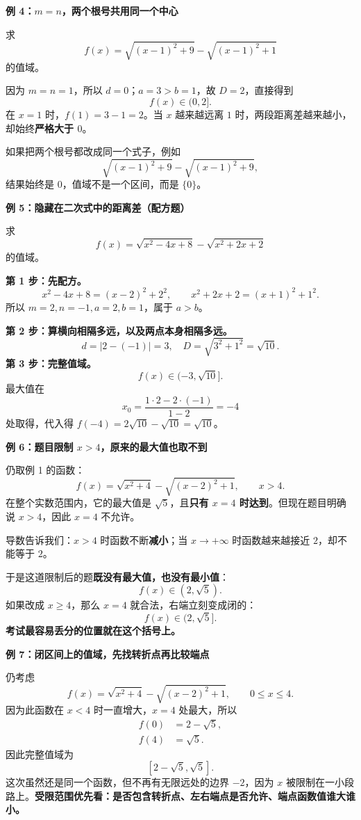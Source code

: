 \clearpage
\begin{examplebox}
	\textbf{\textcolor{CExample}{例 4：$m=n$，两个根号共用同一个中心}}



	求
	\[
		f(x)=\sqrt{(x-1)^2+9}-\sqrt{(x-1)^2+1}
	\]
	的值域。

	因为 $m=n=1$，所以 $d=0$；$a=3>b=1$，故 $D=2$，直接得到
	\[
		\boxed{f(x)\in(0,2]}.
	\]
	在 $x=1$ 时，$f(1)=3-1=2$。当 $x$ 越来越远离 $1$ 时，两段距离差越来越小，却始终\textbf{严格大于 $0$}。

	如果把两个根号都改成同一个式子，例如
	\[
		\sqrt{(x-1)^2+9}-\sqrt{(x-1)^2+9},
	\]
	结果始终是 $0$，值域不是一个区间，而是 $\boxed{\{0\}}$。
\end{examplebox}
\clearpage
\begin{examplebox}
	\textbf{\textcolor{CExample}{例 5：隐藏在二次式中的距离差（配方题）}}



	求
	\[
		f(x)=\sqrt{x^2-4x+8}-\sqrt{x^2+2x+2}
	\]
	的值域。

	\textbf{第 1 步：先配方。}
	\[
		x^2-4x+8=(x-2)^2+2^2,\qquad
		x^2+2x+2=(x+1)^2+1^2.
	\]
	所以 $m=2,n=-1,a=2,b=1$，属于 $a>b$。

	\textbf{第 2 步：算横向相隔多远，以及两点本身相隔多远。}
	\[
		d=|2-(-1)|=3,\quad D=\sqrt{3^2+1^2}=\sqrt{10}.
	\]
	\textbf{第 3 步：完整值域。}
	\[
		\boxed{f(x)\in(-3,\sqrt{10}]}.
	\]
	最大值在
	\[
		x_0=\frac{1\cdot2-2\cdot(-1)}{1-2}=-4
	\]
	处取得，代入得 $f(-4)=2\sqrt{10}-\sqrt{10}=\sqrt{10}$。
\end{examplebox}
\clearpage
\begin{examplebox}
	\textbf{\textcolor{CExample}{例 6：题目限制 $x>4$，原来的最大值也取不到}}



	仍取例 1 的函数：
	\[
		f(x)=\sqrt{x^2+4}-\sqrt{(x-2)^2+1},\qquad x>4.
	\]
	在整个实数范围内，它的最大值是 $\sqrt5$，且\textbf{只有 $x=4$ 时达到}。但现在题目明确说 $x>4$，因此 $x=4$ 不允许。

	导数告诉我们：$x>4$ 时函数不断\textbf{减小}；当 $x\to+\infty$ 时函数越来越接近 $2$，却不能等于 $2$。

	于是这道限制后的题\textbf{既没有最大值，也没有最小值}：
	\[
		\boxed{f(x)\in(2,\sqrt5)}.
	\]
	如果改成 $x\geq4$，那么 $x=4$ 就合法，右端立刻变成闭的：
	\[
		\boxed{f(x)\in(2,\sqrt5]}.
	\]
	\textbf{考试最容易丢分的位置就在这个括号上。}
\end{examplebox}
\clearpage
\begin{examplebox}
	\textbf{\textcolor{CExample}{例 7：闭区间上的值域，先找转折点再比较端点}}



	仍考虑
	\[
		f(x)=\sqrt{x^2+4}-\sqrt{(x-2)^2+1},\qquad 0\leq x\leq4.
	\]
	因为此函数在 $x<4$ 时一直增大，$x=4$ 处最大，所以
	\[
		\begin{aligned}
			f(0) & =2-\sqrt5, \\
			f(4) & =\sqrt5.
		\end{aligned}
	\]
	因此完整值域为
	\[
		\boxed{[2-\sqrt5,\sqrt5]}.
	\]
	这次虽然还是同一个函数，但不再有无限远处的边界 $-2$，因为 $x$ 被限制在一小段路上。\textbf{受限范围优先看：是否包含转折点、左右端点是否允许、端点函数值谁大谁小。}
\end{examplebox}
